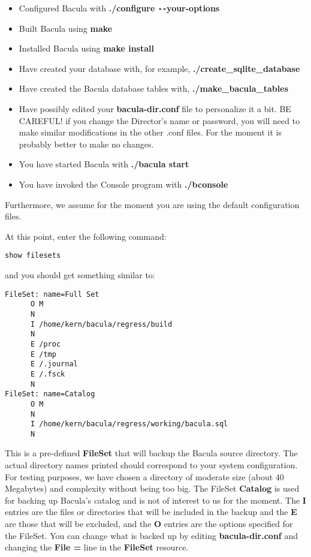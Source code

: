 \begin{itemize}
\item Configured Bacula with {\bf ./configure \verb:--:your-options} 
\item Built Bacula using {\bf make} 
\item Installed Bacula using {\bf make install} 
\item Have created your database with, for example,  {\bf
   ./create\_sqlite\_database} 
\item Have created the Bacula database tables with,  {\bf
   ./make\_bacula\_tables} 
\item Have possibly edited your {\bf bacula-dir.conf} file  to personalize it
   a bit. BE CAREFUL! if you change the  Director's name or password, you will
   need to make similar  modifications in the other .conf files. For the moment
   it is  probably better to make no changes.  
\item You have started Bacula with {\bf ./bacula start}  
\item You have invoked the Console program with {\bf ./bconsole} 
\end{itemize}

Furthermore, we assume for the moment you are using the default configuration
files. 

At this point, enter the following command: 

\footnotesize
\begin{verbatim}
show filesets
\end{verbatim}
\normalsize

and you should get something similar to: 

\footnotesize
\begin{verbatim}
FileSet: name=Full Set
      O M
      N
      I /home/kern/bacula/regress/build
      N
      E /proc
      E /tmp
      E /.journal
      E /.fsck
      N
FileSet: name=Catalog
      O M
      N
      I /home/kern/bacula/regress/working/bacula.sql
      N
\end{verbatim}
\normalsize

This is a pre-defined {\bf FileSet} that will backup the Bacula source
directory. The actual directory names printed should correspond to your system
configuration. For testing purposes, we have chosen a directory of moderate
size (about 40 Megabytes) and complexity without being too big. The FileSet
{\bf Catalog} is used for backing up Bacula's catalog and is not of interest
to us for the moment. The {\bf I} entries are the files or directories that
will be included in the backup and the {\bf E} are those that will be
excluded, and the {\bf O} entries are the options specified for
the FileSet. You can change what is backed up by editing {\bf bacula-dir.conf}  
and changing the {\bf File =} line in the {\bf FileSet} resource.

